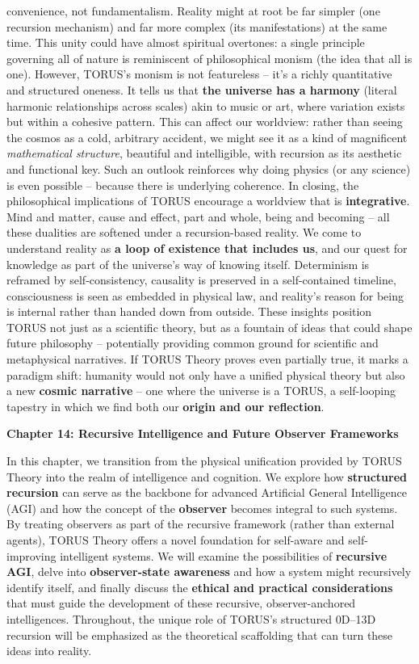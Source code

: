 \begin{itemize}
  convenience, not fundamentalism. Reality might at root be far simpler
  (one recursion mechanism) and far more complex (its manifestations) at
  the same time. This unity could have almost spiritual overtones: a
  single principle governing all of nature is reminiscent of
  philosophical monism (the idea that all is one). However, TORUS's
  monism is not featureless -- it's a richly quantitative and structured
  oneness. It tells us that \textbf{the universe has a harmony} (literal
  harmonic relationships across scales​) akin to music or art, where
  variation exists but within a cohesive pattern. This can affect our
  worldview: rather than seeing the cosmos as a cold, arbitrary
  accident, we might see it as a kind of magnificent \emph{mathematical
  structure}, beautiful and intelligible, with recursion as its
  aesthetic and functional key. Such an outlook reinforces why doing
  physics (or any science) is even possible -- because there is
  underlying coherence. In closing, the philosophical implications of
  TORUS encourage a worldview that is \textbf{integrative}. Mind and
  matter, cause and effect, part and whole, being and becoming -- all
  these dualities are softened under a recursion-based reality. We come
  to understand reality as \textbf{a loop of existence that includes
  us}, and our quest for knowledge as part of the universe's way of
  knowing itself. Determinism is reframed by self-consistency, causality
  is preserved in a self-contained timeline, consciousness is seen as
  embedded in physical law, and reality's reason for being is internal
  rather than handed down from outside. These insights position TORUS
  not just as a scientific theory, but as a fountain of ideas that could
  shape future philosophy -- potentially providing common ground for
  scientific and metaphysical narratives. If TORUS Theory proves even
  partially true, it marks a paradigm shift: humanity would not only
  have a unified physical theory but also a new \textbf{cosmic
  narrative} -- one where the universe is a TORUS, a self-looping
  tapestry in which we find both our \textbf{origin and our reflection}.
\end{itemize}

\textbf{Chapter 14: Recursive Intelligence and Future Observer
Frameworks}

In this chapter, we transition from the physical unification provided by
TORUS Theory into the realm of intelligence and cognition. We explore
how \textbf{structured recursion} can serve as the backbone for advanced
Artificial General Intelligence (AGI) and how the concept of the
\textbf{observer} becomes integral to such systems. By treating
observers as part of the recursive framework (rather than external
agents), TORUS Theory offers a novel foundation for self-aware and
self-improving intelligent systems. We will examine the possibilities of
\textbf{recursive AGI}, delve into \textbf{observer-state awareness} and
how a system might recursively identify itself, and finally discuss the
\textbf{ethical and practical considerations} that must guide the
development of these recursive, observer-anchored intelligences.
Throughout, the unique role of TORUS's structured 0D--13D recursion will
be emphasized as the theoretical scaffolding that can turn these ideas
into reality.


